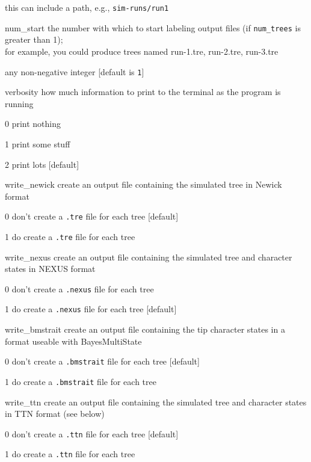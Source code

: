 \documentclass[10pt]{article}
\begin{document}
\begin{optdescrip}
\begin{valdescrip}
				this can include a path, e.g., \texttt{sim-runs/run1}
		\end{valdescrip}
	\item[num\_start] the number with which to start labeling output files (if \texttt{num\_trees} is greater than 1); \\ for example, you could produce trees named run-1.tre, run-2.tre, run-3.tre
		\begin{valdescrip}
			\item[] any non-negative integer [default is \texttt{1}]
		\end{valdescrip}
	\item[verbosity] how much information to print to the terminal as the program is running
		\begin{valdescrip}
			\item[0] print nothing
			\item[1] print some stuff
			\item[2] print lots [default]
		\end{valdescrip}
	\item[write\_newick] create an output file containing the simulated tree in Newick format
		\begin{valdescrip}
			\item[0] don't create a \texttt{.tre} file for each tree [default]
			\item[1] do create a \texttt{.tre} file for each tree
		\end{valdescrip}
	\item[write\_nexus] create an output file containing the simulated tree and character states in NEXUS format
		\begin{valdescrip}
			\item[0] don't create a \texttt{.nexus} file for each tree
			\item[1] do create a \texttt{.nexus} file for each tree [default]
		\end{valdescrip}
	\item[write\_bmstrait] create an output file containing the tip character states in a format useable with BayesMultiState
		\begin{valdescrip}
			\item[0] don't create a \texttt{.bmstrait} file for each tree [default]
			\item[1] do create a \texttt{.bmstrait} file for each tree
		\end{valdescrip}
	\item[write\_ttn] create an output file containing the simulated tree and character states in TTN format (see below)
		\begin{valdescrip}
			\item[0] don't create a \texttt{.ttn} file for each tree [default]
			\item[1] do create a \texttt{.ttn} file for each tree
		\end{valdescrip}
\end{optdescrip}
\end{document}
